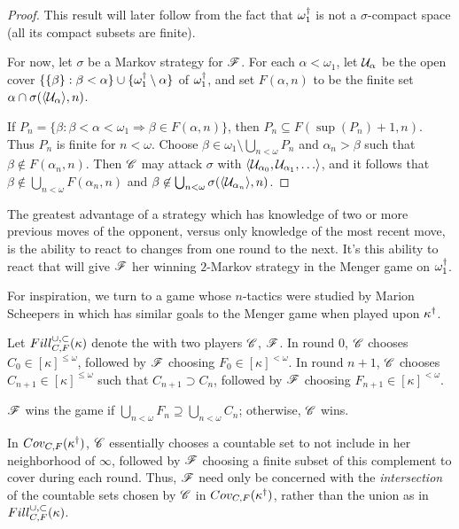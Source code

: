 \begin{proof}
  This result will later follow from the fact that
  $\omega^\dagger_1$ is not a $\sigma$-compact space (all its compact subsets
  are finite).

  For now, let $\sigma$ be a Markov strategy for $\mathscr{F}$. For
  each $\alpha<\omega_1$, let $\mathcal{U}_\alpha$ be the open cover
  $\{\{\beta\}:\beta<\alpha\}\cup\{\omega_1^\dagger\setminus\alpha\}$ of
  $\omega_1^\dagger$, and set $F(\alpha,n)$ to be the finite set
  $\alpha\cap\sigma(\langle\mathcal{U}_\alpha\rangle,n)$.

  If
    $
      P_n =
      \{\beta: \beta < \alpha < \omega_1 \Rightarrow \beta \in F(\alpha,n)\}
    $,
  then $P_n\subseteq F(\sup(P_n)+1,n)$. Thus $P_n$ is finite for $n<\omega$.
  Choose $\beta\in\omega_1\setminus \bigcup_{n<\omega}P_n$
  and $\alpha_n>\beta$ such that $\beta\not\in F(\alpha_n,n)$.
  Then $\mathscr{C}$ may attack
  $\sigma$ with $\<\mc U_{\alpha_0}, \mc U_{\alpha_1},\dots\>$,
  and it follows that
  $\beta\not\in \bigcup_{n<\omega}F(\alpha_n,n)$ and
  $\beta\not\in \bigcup_{n<\omega}\sigma(\langle\mathcal{U}_{\alpha_n}\rangle,n)$.
\end{proof}

The greatest advantage of a strategy which has knowledge of two or more previous
moves of the opponent, versus only knowledge of the most recent move, is the
ability to react to changes from one round to the next. It's this ability to
react that will give $\mathscr{F}$ her winning $2$-Markov strategy in the Menger
game on $\omega^\dagger_1$.

For inspiration, we turn to a game whose $n$-tactics were studied by Marion
Scheepers in \cite{MR1129143} which has similar goals to the Menger game when
played upon $\kappa^\dagger$.

\begin{game}
  Let $Fill^{\cup,\subset}_{C,F}(\kappa)$ denote the 
  with two players $\mathscr{C}$, $\mathscr{F}$. In round $0$, $\mathscr{C}$ chooses
  $C_0\in[\kappa]^{\leq\omega}$, followed by $\mathscr{F}$ choosing
  $F_0\in[\kappa]^{<\omega}$. In round $n+1$, $\mathscr{C}$ chooses
  $C_{n+1}\in[\kappa]^{\leq\omega}$ such that $C_{n+1}\supset C_n$, followed
  by $\mathscr{F}$ choosing $F_{n+1}\in[\kappa]^{<\omega}$.

  $\mathscr{F}$ wins the game if
  $\bigcup_{n<\omega} F_n\supseteq\bigcup_{n<\omega} C_n$; otherwise, $\mathscr{C}$
  wins.
\end{game}

In $Cov_{C,F}(\kappa^\dagger)$, $\mathscr{C}$ essentially chooses a countable set
to not include in her neighborhood of $\infty$, followed by $\mathscr{F}$ choosing
a finite subset of this complement to cover during each round. Thus,
$\mathscr{F}$ need only be concerned with the \textit{intersection} of the
countable sets chosen by $\mathscr{C}$ in $Cov_{C,F}(\kappa^\dagger)$, rather
than the union as in $Fill^{\cup,\subset}_{C,F}(\kappa)$.

